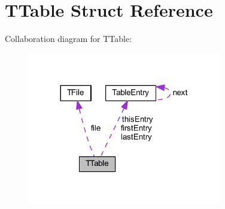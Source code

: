 \hypertarget{struct_t_table}{}\section{T\+Table Struct Reference}
\label{struct_t_table}


Collaboration diagram for T\+Table\+:
\nopagebreak
\begin{figure}[H]
\begin{center}
\leavevmode
\includegraphics[width=240pt]{db/d62/struct_t_table__coll__graph}
\end{center}
\end{figure}

